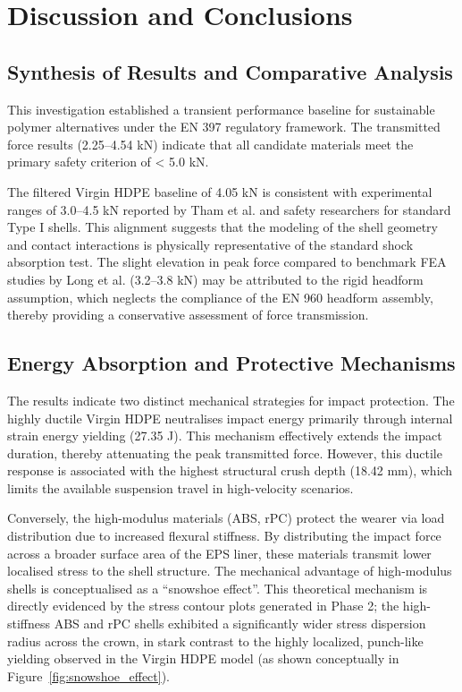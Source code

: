 \chapter{Discussion and Conclusions}

\section{Synthesis of Results and Comparative Analysis}
This investigation established a transient performance baseline 
for sustainable polymer alternatives under the EN 397 regulatory framework. 
The transmitted force results (2.25--4.54 kN) indicate that all 
candidate materials meet the primary safety criterion of < 5.0 kN. 

The filtered Virgin HDPE baseline of 4.05 kN is consistent with 
experimental ranges of 3.0--4.5 kN reported by Tham et al. \cite{tham2014} 
and safety researchers for standard Type I shells. This alignment 
suggests that the modeling of the shell geometry and contact 
interactions is physically representative of the standard shock 
absorption test. The slight elevation in peak force compared to 
benchmark FEA studies by Long et al. \cite{long2015} (3.2--3.8 kN) 
may be attributed to the rigid headform assumption, which neglects the 
compliance of the EN 960 headform assembly, thereby providing a 
conservative assessment of force transmission.

\section{Energy Absorption and Protective Mechanisms}
The results indicate two distinct mechanical strategies for impact 
protection. The highly ductile Virgin HDPE neutralises impact energy 
primarily through internal strain energy yielding (27.35 J). This 
mechanism effectively extends the impact duration, thereby attenuating 
the peak transmitted force. However, this ductile response is 
associated with the highest structural crush depth (18.42 mm), which 
limits the available suspension travel in high-velocity scenarios.

Conversely, the high-modulus materials (ABS, rPC) protect the wearer 
via load distribution due to increased flexural stiffness. By 
distributing the impact force across a broader surface area of the 
EPS liner, these materials transmit lower localised stress to the 
shell structure. The mechanical advantage of high-modulus shells is conceptualised as a ``snowshoe effect''. This theoretical mechanism is directly evidenced by the stress contour plots generated in Phase 2; the high-stiffness ABS and rPC shells exhibited a significantly wider stress dispersion radius across the crown, in stark contrast to the highly localized, punch-like yielding observed in the Virgin HDPE model (as shown conceptually in Figure~\ref{fig:snowshoe_effect}).

